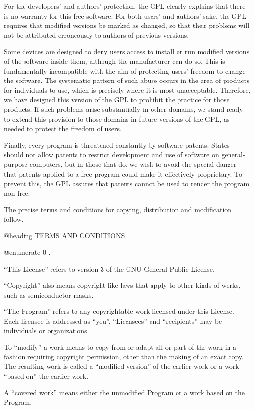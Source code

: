 For the developers' and authors' protection, the GPL clearly explains
that there is no warranty for this free software.  For both users' and
authors' sake, the GPL requires that modified versions be marked as
changed, so that their problems will not be attributed erroneously to
authors of previous versions.

Some devices are designed to deny users access to install or run
modified versions of the software inside them, although the
manufacturer can do so.  This is fundamentally incompatible with the
aim of protecting users' freedom to change the software.  The
systematic pattern of such abuse occurs in the area of products for
individuals to use, which is precisely where it is most unacceptable.
Therefore, we have designed this version of the GPL to prohibit the
practice for those products.  If such problems arise substantially in
other domains, we stand ready to extend this provision to those
domains in future versions of the GPL, as needed to protect the
freedom of users.

Finally, every program is threatened constantly by software patents.
States should not allow patents to restrict development and use of
software on general-purpose computers, but in those that do, we wish
to avoid the special danger that patents applied to a free program
could make it effectively proprietary.  To prevent this, the GPL
assures that patents cannot be used to render the program non-free.

The precise terms and conditions for copying, distribution and
modification follow.

@heading TERMS AND CONDITIONS

@enumerate 0
\itemDefinitions.

``This License'' refers to version 3 of the GNU General Public License.

``Copyright'' also means copyright-like laws that apply to other kinds
of works, such as semiconductor masks.

``The Program'' refers to any copyrightable work licensed under this
License.  Each licensee is addressed as ``you''.  ``Licensees'' and
``recipients'' may be individuals or organizations.

To ``modify'' a work means to copy from or adapt all or part of the work
in a fashion requiring copyright permission, other than the making of
an exact copy.  The resulting work is called a ``modified version'' of
the earlier work or a work ``based on'' the earlier work.

A ``covered work'' means either the unmodified Program or a work based
on the Program.

